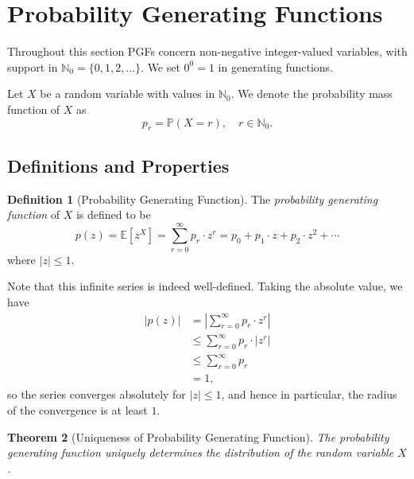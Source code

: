 \documentclass[11pt]{article}
\numberwithin{equation}{section}
\newtheorem{theorem}{Theorem}[section]
\theoremstyle{definition}
\newtheorem{definition}[theorem]{Definition}
\theoremstyle{remark}
\newcommand{\pqty}[1]{\left(#1\right)}
\newcommand{\bqty}[1]{\left[#1\right]}
\newcommand{\abs}[1]{\left|#1\right|}
\newcommand{\NN}{\mathbb N}
\newcommand{\Prob}{\mathbb P}
\newcommand{\Expt}{\mathbb E}
\begin{document}
\section{Probability Generating Functions}\label{probability-section-09}

Throughout this section PGFs concern non-negative integer-valued variables, with support in \(\NN_0=\{0,1,2,\ldots\}\). We set \(0^0=1\) in generating functions.

Let \(X\) be a random variable with values in \(\NN_0\). We denote the probability mass function of \(X\) as
\[
    p_r = \Prob\pqty{X = r}, \quad r \in \NN_0.
\]

\subsection{Definitions and Properties}

\begin{definition}[Probability Generating Function]\label{probability-definition-039}
    \label{probability-def:probability-generating-function}%
    The \emph{probability generating function} of \(X\) is defined to be
    \[
        p \pqty{z} = \Expt\bqty{z^X} = \sum_{r = 0}^{\infty} p_r \cdot z^r = p_0 + p_1 \cdot z + p_2 \cdot z^2 + \cdots
    \]
    where \(\abs{z} \leq 1\).
\end{definition}

Note that this infinite series is indeed well-defined. Taking the absolute value, we have
\begin{align*}
    \abs{p\pqty{z}} &= \abs{\sum_{r = 0}^{\infty} p_r \cdot z^r} \\
    &\leq \sum_{r = 0}^{\infty} p_r \cdot \abs{z^r} \\
    &\leq \sum_{r = 0}^{\infty} p_r \\
    &= 1,
\end{align*}
so the series converges absolutely for \(\abs{z} \leq 1\), and hence in particular, the radius of the convergence is at least \(1\).

\begin{theorem}[Uniqueness of Probability Generating Function]\label{probability-theorem-011}
    \label{probability-thm:pgf-uniqueness}%
    The probability generating function uniquely determines the distribution of the random variable \(X\).
\end{theorem}
\end{document}
